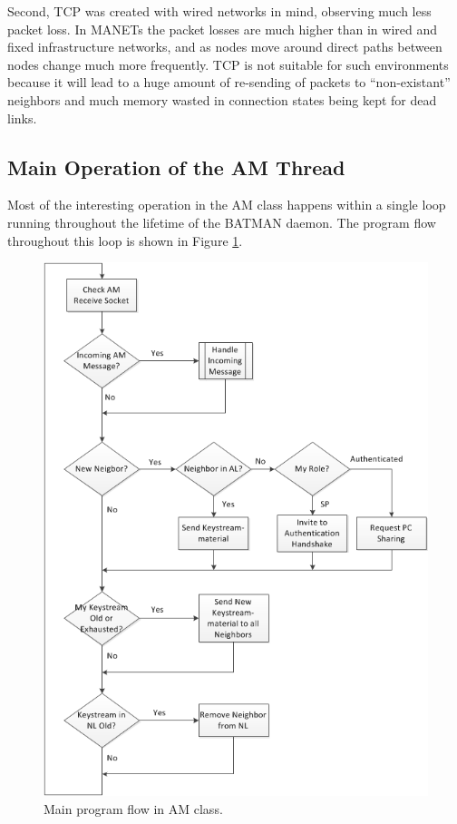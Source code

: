 Second, TCP was created with wired networks in mind, observing much less packet
loss. In \acp{MANET} the packet losses are much higher than in wired and fixed
infrastructure networks, and as nodes move around direct paths between nodes
change much more frequently. TCP is not suitable for such environments because
it will lead to a huge amount of re-sending of packets to ``non-existant''
neighbors and much memory wasted in connection states being kept for dead links.

\subsection{Main Operation of the AM Thread}
Most of the interesting operation in the AM class happens within a single loop
running throughout the lifetime of the BATMAN daemon. The program flow
throughout this loop is shown in Figure \ref{fig:am_main_loop}.

\begin{figure}[h!]
	\centering
	\includegraphics[width=\textwidth]{images/am_main_loop.png}
	\caption{Main program flow in AM class.}
	\label{fig:am_main_loop}
	\clearpage
\end{figure}

